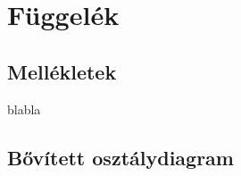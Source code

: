 \appendix
\chapter*{Függelék}
\setcounter{chapter}{6}  %
\setcounter{equation}{0} %
\setcounter{footnote}{0}

\section{Mellékletek}\label{sect:mellekletek}

blabla

\newpage
\section{Bővített osztálydiagram}\label{sect:osztalydiagram}

